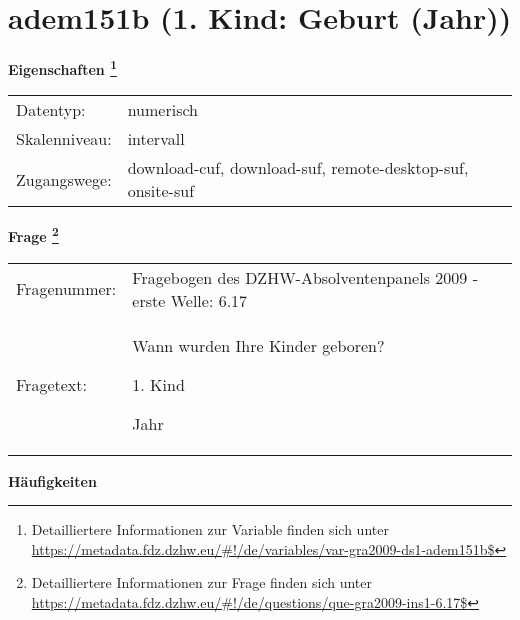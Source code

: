 
    \setcounter{footnote}{0}

    \vspace*{-1.8cm}
	\section{adem151b (1. Kind: Geburt (Jahr))}
	\label{section:adem151b}



    \vspace*{0.5cm}
    \noindent\textbf{Eigenschaften
	\footnote{Detailliertere Informationen zur Variable finden sich unter
		\url{https://metadata.fdz.dzhw.eu/\#!/de/variables/var-gra2009-ds1-adem151b$}}}\\
	\begin{tabularx}{\hsize}{@{}lX}
	Datentyp: & numerisch \\
	Skalenniveau: & intervall \\
	Zugangswege: &
	  download-cuf, 
	  download-suf, 
	  remote-desktop-suf, 
	  onsite-suf
 \\
    \end{tabularx}



				\vspace*{0.5cm}
                \noindent\textbf{Frage
	                \footnote{Detailliertere Informationen zur Frage finden sich unter
		              \url{https://metadata.fdz.dzhw.eu/\#!/de/questions/que-gra2009-ins1-6.17$}}}\\
				\begin{tabularx}{\hsize}{@{}lX}
					Fragenummer: &
					  Fragebogen des DZHW-Absolventenpanels 2009 - erste Welle:
					  6.17
 \\
					Fragetext: & Wann wurden Ihre Kinder geboren?\par  1. Kind\par  Jahr \\
				\end{tabularx}





        		\vspace*{0.5cm}
                \noindent\textbf{Häufigkeiten}


